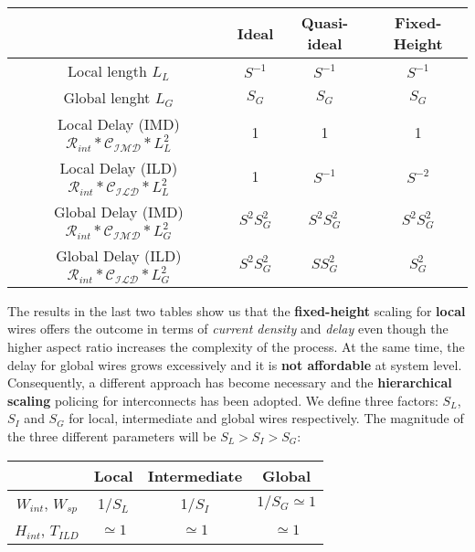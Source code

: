 \documentclass[a4paper, 12pt, twoside, openright]{report}
\begin{document}
\begin{table}[H] {
\begin{center} {
\begin{tabular}{||c|c|c|c||}
\hline
&Ideal&Quasi-ideal&Fixed-Height\\
\hline
Local length \textbf{$L_{L}$}&$S^{-1}$&$S^{-1}$&$S^{-1}$\\
\hline
Global lenght \textbf{$L_{G}$}&$S_{G}$&$S_{G}$&$S_{G}$\\
\hline
Local Delay (IMD) \textbf{$\mathcal{R}_{int}*\mathcal{C_{IMD}}*L_L^2$}&1&1&1\\
\hline
Local Delay (ILD) \textbf{$\mathcal{R}_{int}*\mathcal{C_{ILD}}*L_L^2$}&1&$S^{-1}$&$S^{-2}$\\
\hline
Global Delay (IMD) \textbf{$\mathcal{R}_{int}*\mathcal{C_{IMD}}*L_G^2$}&$S^{2}S_G^2$&$S^{2}S_G^2$&$S^{2}S_G^2$\\
\hline
Global Delay (ILD) \textbf{$\mathcal{R}_{int}*\mathcal{C_{ILD}}*L_G^2$}&$S^{2}S_G^2$&$S S_G^2$&$S_G^2$\\
\hline
\end{tabular} }
\end{center} }
\end{table}

The results in the last two tables show us that the \textbf{fixed-height} scaling for \textbf{local} wires offers the outcome in terms of \textit{current density} and \textit{delay} even though the higher aspect ratio increases the complexity of the process. 
At the same time, the delay for global wires grows excessively and it is \textbf{not affordable} at system level. Consequently, a different approach has become necessary and the \textbf{hierarchical scaling} policing for interconnects has been adopted. We define three factors: $S_{L}$, $S_{I}$ and $S_{G}$ for local, intermediate and global wires respectively. The magnitude of the three different parameters will be $S_{L}>S_{I}>S_{G}$:

\begin{table}[H] {
\begin{center} {
\begin{tabular}{||c|c|c|c||}
\hline
&Local&Intermediate&Global\\
\hline
$W_{int}$, $W_{sp}$&1/$S_{L}$&1/$S_{I}$&$1/S_{G} \simeq 1$\\
\hline
$H_{int}$, $T_{ILD}$&$\simeq 1$&$\simeq 1$&$\simeq 1$\\
\hline
\end{tabular} }
\end{center} }
\end{table}
\end{document}
